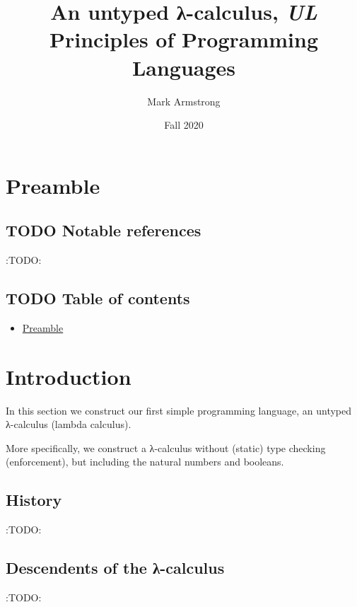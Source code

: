 \documentclass[11pt]{article}
\author{Mark Armstrong}
\date{Fall 2020}
\title{An untyped λ-calculus, \emph{UL}\\\medskip
\large Principles of Programming Languages}
\theoremstyle{definition}
\begin{document}
\maketitle

\section{Preamble}
\label{sec:orgc8cf6da}

\subsection{{\bfseries\sffamily TODO} Notable references}
\label{sec:org2d92596}

:TODO:

\subsection{{\bfseries\sffamily TODO} Table of contents}
\label{sec:org12066f1}

\begin{scriptsize}
\begin{itemize}
\item \hyperref[sec:orgc8cf6da]{Preamble}
\end{itemize}
\end{scriptsize}

\section{Introduction}
\label{sec:org6d8632e}

In this section we construct our first simple programming language,
an untyped λ-calculus (lambda calculus).

More specifically, we construct a λ-calculus
without (static) type checking (enforcement),
but including the natural numbers and booleans.

\subsection{History}
\label{sec:org6b1663a}

:TODO:

\subsection{Descendents of the λ-calculus}
\label{sec:orgf4e57d3}

:TODO:
\end{document}
